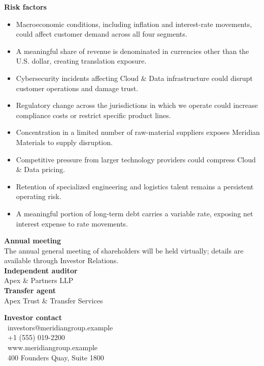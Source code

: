 \documentclass[11pt,oneside,a4paper]{scrbook}
\newcommand{\goldrule}{\noindent{\color{merGold}\rule{\linewidth}{1.1pt}}\par\vspace{2pt}\noindent{\color{merNavy!25}\rule{\linewidth}{0.4pt}}\vspace{10pt}\par}
\begin{document}
\vspace{10pt}
{\bfseries\color{merNavy} Risk factors}\par
\begin{itemize}[leftmargin=1.4em,label={\color{merSlate}\faLock}]
\item Macroeconomic conditions, including inflation and interest-rate movements, could affect customer demand across all four segments.
\item A meaningful share of revenue is denominated in currencies other than the U.S. dollar, creating translation exposure.
\item Cybersecurity incidents affecting Cloud \& Data infrastructure could disrupt customer operations and damage trust.
\item Regulatory change across the jurisdictions in which we operate could increase compliance costs or restrict specific product lines.
\item Concentration in a limited number of raw-material suppliers exposes Meridian Materials to supply disruption.
\item Competitive pressure from larger technology providers could compress Cloud \& Data pricing.
\item Retention of specialized engineering and logistics talent remains a persistent operating risk.
\item A meaningful portion of long-term debt carries a variable rate, exposing net interest expense to rate movements.
\end{itemize}

\backmatter
{}
\goldrule

\begin{minipage}[t]{0.48\linewidth}
{\bfseries\color{merNavy} Annual meeting}\\
The annual general meeting of shareholders will be held virtually; details are available through Investor Relations.\\[10pt]
{\bfseries\color{merNavy} Independent auditor}\\
Apex \& Partners LLP\\[10pt]
{\bfseries\color{merNavy} Transfer agent}\\
Apex Trust \& Transfer Services
\end{minipage}\hfill
\begin{minipage}[t]{0.48\linewidth}
{\bfseries\color{merNavy} Investor contact}\\
\faEnvelope\ investors@meridiangroup.example\\
\faPhone\ +1 (555) 019-2200\\
\faGlobe\ www.meridiangroup.example\\
\faMapMarker\ 400 Founders Quay, Suite 1800
\end{minipage}
\par
\vspace{18pt}
\end{document}
